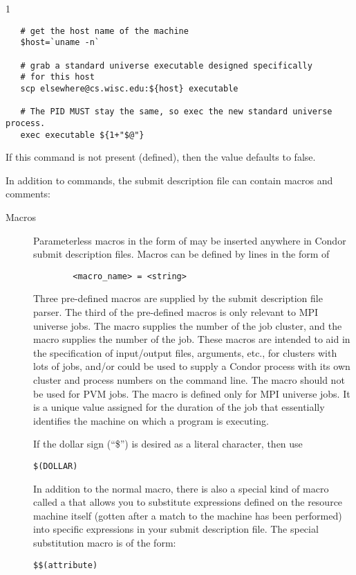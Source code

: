 \begin{ManPage}{\label{man-condor-submit}}{1}
\begin{description}
\begin{verbatim}
   # get the host name of the machine
   $host=`uname -n`

   # grab a standard universe executable designed specifically
   # for this host
   scp elsewhere@cs.wisc.edu:${host} executable

   # The PID MUST stay the same, so exec the new standard universe process.
   exec executable ${1+"$@"}
\end{verbatim} 
If this command is not present (defined), then the value
defaults to false.

\end{description}

In addition to commands, the submit description file can contain macros
and comments:

\begin{description}

\item[Macros] Parameterless macros in the form of 
may be inserted anywhere in Condor submit description files. Macros can be
defined by lines in the form of 
\begin{verbatim} 
        <macro_name> = <string> 
\end{verbatim} 
Three pre-defined macros are supplied by the submit description file parser.
The third of the pre-defined macros is only relevant to MPI universe
jobs.
The
 macro supplies the number of the job cluster, and the
 macro supplies the number of the job. These macros are
intended to aid in the specification of input/output files, arguments,
etc., for clusters with lots of jobs, and/or could be used to supply a
Condor process with its own cluster and process numbers on the command
line.  The  macro should not be used for PVM jobs.
The 
 macro is defined only for MPI universe jobs.
It is a unique value assigned for the duration of the job
that essentially identifies the machine on which a program is
executing.

If the dollar sign (``\$'') is desired as a literal character,
then use
\begin{verbatim}
$(DOLLAR)
\end{verbatim}

In addition to the normal macro, there is also a special kind of macro
called a  that allows you to substitute
expressions defined on the resource machine itself (gotten after a match
to the machine has been performed) into specific expressions in your
submit description file. The special substitution macro is of the form:
\begin{verbatim} 
$$(attribute)
\end{verbatim}


\end{description}
\end{ManPage}
